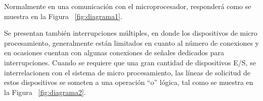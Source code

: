 \documentclass[12pt, letter]{article}
\begin{document}
\setlength{\parindent}{31pt}
Normalmente en una comunicación con el microprocesador, responderá como se muestra  en la Figura ~\ref{fig:diagrama1}.

\setlength{\parindent}{31pt}
Se presentan también interrupciones múltiples, en donde los dispositivos de micro procesamiento, generalmente están limitados en cuanto al número de conexiones y en ocasiones cuentan con algunas conexiones de señales dedicados para interrupciones. Cuando se requiere que una gran cantidad de dispositivos E/S, se interrelacionen con el sistema de micro procesamiento, las líneas de solicitud de estos dispositivos se someten a una operación “o” lógica, tal como se muestra en la Figura ~\ref{fig:diagrama2}.
\end{document}
